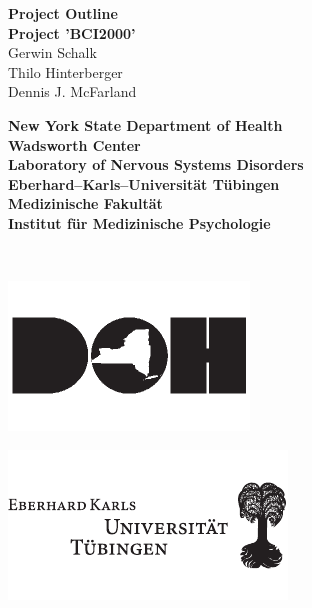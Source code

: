 \begin{titlepage}
\hspace{-7mm}%
\begin{minipage}{\textwidth}
\begin{center}
\vspace{.5cm}
{\large \bf Project Outline\\[3ex]}
{\huge \bf Project 'BCI2000'}
\\[1.5cm]
{\Large Gerwin Schalk\\}
{\Large Thilo Hinterberger\\}
{\Large Dennis J. McFarland\\[1.5cm]}
%
\begin{minipage}{13cm}
  \begin{minipage}[c]{13cm}
    \begin{center}
      {\Large \bf New York State Department of Health\\[2ex]}
      {\large \bf Wadsworth Center\\[0.5ex]
       Laboratory of Nervous Systems Disorders\\[4ex]}
      {\Large \bf Eberhard--Karls--Universit\"at T\"ubingen\\[2ex]}
      {\large \bf Medizinische Fakult\"at\\[0.5ex]
       Institut f\"ur Medizinische Psychologie\\[0.5ex]}
    \end{center}
  \end{minipage}
  \\[1.0cm]
  \begin{minipage}[c]{6cm}
    \centerline{\includegraphics{figures/DOHlogo}}
  \end{minipage}
  \hspace{1.5cm}
  \begin{minipage}[c]{3cm}
    \centerline{\includegraphics{figures/EKUlogo}}

\end{minipage}
\end{minipage}
\end{center}
\end{minipage}
\end{titlepage}
